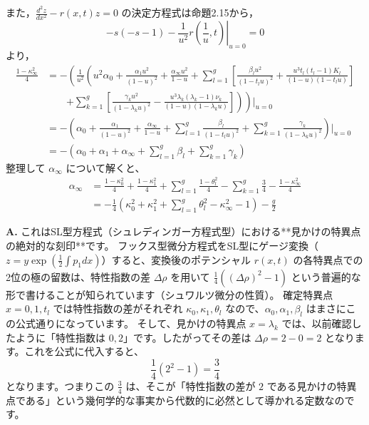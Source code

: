 \begin{story}
また，$\frac{d^2 z}{dx^2} - r(x,t)z = 0$ の決定方程式は命題2.15から，
\begin{equation*}
    -s(-s-1) - \left. \frac{1}{u^2} r\left(\frac{1}{u}, t\right) \right|_{u=0} = 0
\end{equation*}
より，
\begin{align*}
    \frac{1-\kappa_\infty^2}{4} &= - \left( \frac{1}{u^2} \left( u^2\alpha_0 + \frac{\alpha_1 u^2}{(1-u)^2} + \frac{\alpha_\infty u^2}{1-u} + \sum_{l=1}^g \left[ \frac{\beta_l u^2}{(1-t_l u)^2} + \frac{u^3 t_l(t_l-1)K_l}{(1-u)(1-t_l u)} \right] \right. \right. \\
    &\qquad \left. \left. + \sum_{k=1}^g \left[ \frac{\gamma_k u^2}{(1-\lambda_k u)^2} - \frac{u^3 \lambda_k(\lambda_k-1)\nu_k}{(1-u)(1-\lambda_k u)} \right] \right) \right) \Bigg|_{u=0} \\
    &= - \left( \alpha_0 + \frac{\alpha_1}{(1-u)^2} + \frac{\alpha_\infty}{1-u} + \sum_{l=1}^g \frac{\beta_l}{(1-t_l u)^2} + \sum_{k=1}^g \frac{\gamma_k}{(1-\lambda_k u)^2} \right) \Bigg|_{u=0} \\
    &= -\left( \alpha_0 + \alpha_1 + \alpha_\infty + \sum_{l=1}^g \beta_l + \sum_{k=1}^g \gamma_k \right)
\end{align*}
整理して $\alpha_\infty$ について解くと、
\begin{align*}
    \alpha_\infty &= \frac{1-\kappa_0^2}{4} + \frac{1-\kappa_1^2}{4} + \sum_{l=1}^g \frac{1-\theta_l^2}{4} - \sum_{k=1}^g \frac{3}{4} - \frac{1-\kappa_\infty^2}{4} \\
    &= -\frac{1}{4} \left( \kappa_0^2 + \kappa_1^2 + \sum_{l=1}^g \theta_l^2 - \kappa_\infty^2 - 1 \right) - \frac{g}{2}
\end{align*}
\end{story}

\begin{Q}[【深掘り】式(3.85)の見かけの特異点 $x=\lambda_k$ の項にある「$3/4$」という数字はどこから来たのか？]
\textbf{A.} これはSL型方程式（シュレディンガー方程式型）における**見かけの特異点の絶対的な刻印**です。
フックス型微分方程式をSL型にゲージ変換（$z = y \exp(\frac{1}{2}\int p_1 dx)$）すると、変換後のポテンシャル $r(x,t)$ の各特異点での2位の極の留数は、特性指数の差 $\Delta \rho$ を用いて $\frac{1}{4}((\Delta \rho)^2 - 1)$ という普遍的な形で書けることが知られています（シュワルツ微分の性質）。
確定特異点 $x=0, 1, t_l$ では特性指数の差がそれぞれ $\kappa_0, \kappa_1, \theta_l$ なので、$\alpha_0, \alpha_1, \beta_l$ はまさにこの公式通りになっています。
そして、見かけの特異点 $x=\lambda_k$ では、以前確認したように「特性指数は $0, 2$」です。したがってその差は $\Delta \rho = 2 - 0 = 2$ となります。これを公式に代入すると、
$$ \frac{1}{4}(2^2 - 1) = \frac{3}{4} $$
となります。つまりこの $\frac{3}{4}$ は、そこが「特性指数の差が $2$ である見かけの特異点である」という幾何学的な事実から代数的に必然として導かれる定数なのです。
\end{Q}

